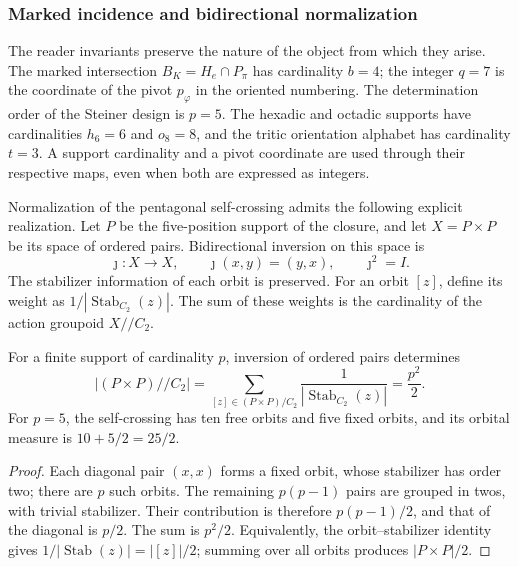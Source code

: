 \subsubsection{Marked incidence and bidirectional normalization}
\label{sec:ii09-normalizacion-bidireccional}

The reader invariants preserve the nature of the object from which
they arise. The marked intersection $B_K=H_e\cap P_\pi$ has cardinality
$b=4$; the integer $q=7$ is the coordinate of the pivot $p_\varphi$ in
the oriented numbering. The determination order of the Steiner
design is $p=5$. The hexadic and octadic supports have cardinalities $h_6=6$
and $o_8=8$, and the tritic orientation alphabet has cardinality $t=3$.
A support cardinality and a pivot coordinate are used through
their respective maps, even when both are expressed as integers.

Normalization of the pentagonal self-crossing admits the following
explicit realization. Let $P$ be the five-position support of the closure,
and let $X=P\times P$ be its space of ordered pairs. Bidirectional
inversion on this space is
\[
 \jmath:X\longrightarrow X,\qquad \jmath(x,y)=(y,x),
 \qquad\jmath^2=I.
\]
The stabilizer information of each orbit is preserved. For an
orbit $[z]$, define its weight as
$1/|\operatorname{Stab}_{C_2}(z)|$. The sum of these weights is the
cardinality of the action groupoid $X/\!/C_2$.

\begin{proposition}
\label{prop:ii09-semicuadrado-orbital}
For a finite support of cardinality $p$, inversion of ordered pairs
determines
\[
 |(P\times P)/\!/C_2|
 =\sum_{[z]\in(P\times P)/C_2}
      \frac1{|\operatorname{Stab}_{C_2}(z)|}
 =\frac{p^2}{2}.
\]
For $p=5$, the self-crossing has ten free orbits and five fixed
orbits, and its orbital measure is $10+5/2=25/2$.
\end{proposition}
\begin{proof}
Each diagonal pair $(x,x)$ forms a fixed orbit, whose stabilizer
has order two; there are $p$ such orbits. The remaining $p(p-1)$ pairs
are grouped in twos, with trivial stabilizer. Their contribution is
therefore $p(p-1)/2$, and that of the diagonal is $p/2$. The sum is
$p^2/2$. Equivalently, the orbit--stabilizer identity gives
$1/|\operatorname{Stab}(z)|=|[z]|/2$; summing over all orbits
produces $|P\times P|/2$.
\end{proof}

